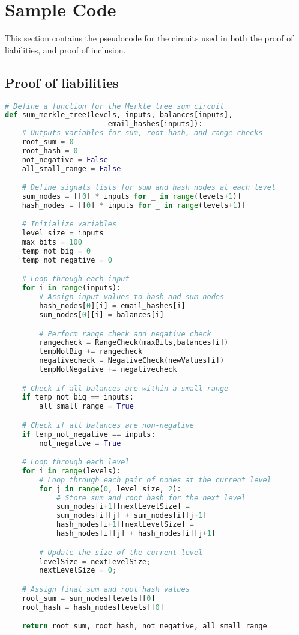 
\appendix
\chapter{Sample Code}
This section contains the pseudocode for the circuits used in both the proof of liabilities, and proof of inclusion.

\section{Proof of liabilities}
\label{subsec:plc}
\begin{lstlisting}[language=Python, caption=Liabilities circuit pseudocode]
# Define a function for the Merkle tree sum circuit
def sum_merkle_tree(levels, inputs, balances[inputs], 
                        email_hashes[inputs]):
    # Outputs variables for sum, root hash, and range checks
    root_sum = 0
    root_hash = 0
    not_negative = False
    all_small_range = False

    # Define signals lists for sum and hash nodes at each level
    sum_nodes = [[0] * inputs for _ in range(levels+1)]
    hash_nodes = [[0] * inputs for _ in range(levels+1)]

    # Initialize variables
    level_size = inputs
    max_bits = 100
    temp_not_big = 0
    temp_not_negative = 0

    # Loop through each input
    for i in range(inputs):
        # Assign input values to hash and sum nodes
        hash_nodes[0][i] = email_hashes[i]
        sum_nodes[0][i] = balances[i]

        # Perform range check and negative check
        rangecheck = RangeCheck(maxBits,balances[i])
        tempNotBig += rangecheck
        negativecheck = NegativeCheck(newValues[i])
        tempNotNegative += negativecheck

    # Check if all balances are within a small range
    if temp_not_big == inputs:
        all_small_range = True

    # Check if all balances are non-negative
    if temp_not_negative == inputs:
        not_negative = True

    # Loop through each level
    for i in range(levels):
        # Loop through each pair of nodes at the current level
        for j in range(0, level_size, 2):
            # Store sum and root hash for the next level
            sum_nodes[i+1][nextLevelSize] = 
            sum_nodes[i][j] + sum_nodes[i][j+1]
            hash_nodes[i+1][nextLevelSize] = 
            hash_nodes[i][j] + hash_nodes[i][j+1]

        # Update the size of the current level
        levelSize = nextLevelSize;
        nextLevelSize = 0;

    # Assign final sum and root hash values
    root_sum = sum_nodes[levels][0]
    root_hash = hash_nodes[levels][0]

    return root_sum, root_hash, not_negative, all_small_range

\end{lstlisting}

